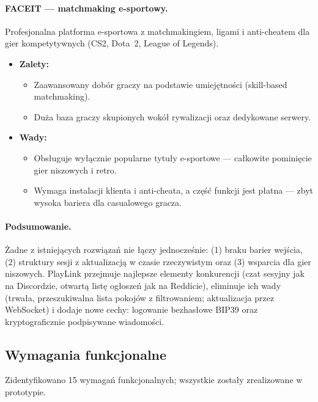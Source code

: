 \paragraph{FACEIT — matchmaking e-sportowy.}
Profesjonalna platforma e-sportowa z matchmakingiem, ligami i anti-cheatem dla gier
kompetytywnych (CS2, Dota~2, League of Legends).

\begin{itemize}
  \item \textbf{Zalety:}
  \begin{itemize}
    \item Zaawansowany dobór graczy na podstawie umiejętności (skill-based matchmaking).
    \item Duża baza graczy skupionych wokół rywalizacji oraz dedykowane serwery.
  \end{itemize}
  \item \textbf{Wady:}
  \begin{itemize}
    \item Obsługuje wyłącznie popularne tytuły e-sportowe — całkowite pominięcie gier
          niszowych i retro.
    \item Wymaga instalacji klienta i anti-cheata, a część funkcji jest płatna —
          zbyt wysoka bariera dla casualowego gracza.
  \end{itemize}
\end{itemize}

\paragraph{Podsumowanie.}
Żadne z istniejących rozwiązań nie łączy jednocześnie: (1) braku barier wejścia,
(2) struktury sesji z aktualizacją w czasie rzeczywistym oraz (3) wsparcia dla gier
niszowych. PlayLink przejmuje najlepsze elementy konkurencji (czat sesyjny jak na
Discordzie, otwartą listę ogłoszeń jak na Reddicie), eliminuje ich wady (trwała,
przeszukiwalna lista pokojów z filtrowaniem; aktualizacja przez WebSocket) i dodaje
nowe cechy: logowanie bezhasłowe BIP39 oraz kryptograficznie podpisywane wiadomości.

\subsection{Wymagania funkcjonalne}
\label{sec:wf}

Zidentyfikowano 15 wymagań funkcjonalnych; wszystkie zostały zrealizowane w prototypie.

